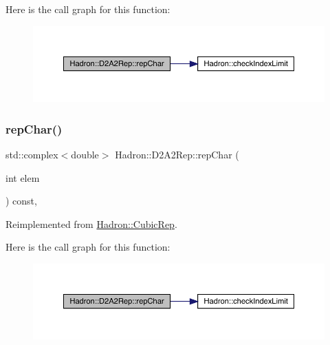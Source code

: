 Here is the call graph for this function\+:
\nopagebreak
\begin{figure}[H]
\begin{center}
\leavevmode
\includegraphics[width=350pt]{d2/dfc/structHadron_1_1D2A2Rep_a27712e402af9b022dee4cccf805ebe86_cgraph}
\end{center}
\end{figure}
\mbox{\label{structHadron_1_1D2A2Rep_a27712e402af9b022dee4cccf805ebe86}} 
\subsubsection{\texorpdfstring{repChar()}{repChar()}\hspace{0.1cm}{\footnotesize\ttfamily [2/2]}}
{\footnotesize\ttfamily std\+::complex$<$double$>$ Hadron\+::\+D2\+A2\+Rep\+::rep\+Char (\begin{DoxyParamCaption}\item[{int}]{elem }\end{DoxyParamCaption}) const\hspace{0.3cm}{\ttfamily [inline]}, {\ttfamily [virtual]}}



Reimplemented from \mbox{\hyperlink{structHadron_1_1CubicRep_af45227106e8e715e84b0af69cd3b36f8}{Hadron\+::\+Cubic\+Rep}}.

Here is the call graph for this function\+:
\nopagebreak
\begin{figure}[H]
\begin{center}
\leavevmode
\includegraphics[width=350pt]{d2/dfc/structHadron_1_1D2A2Rep_a27712e402af9b022dee4cccf805ebe86_cgraph}
\end{center}
\end{figure}
\mbox{\label{structHadron_1_1D2A2Rep_a75e7a00548888c39a9e3613c4b5178ef}} 
